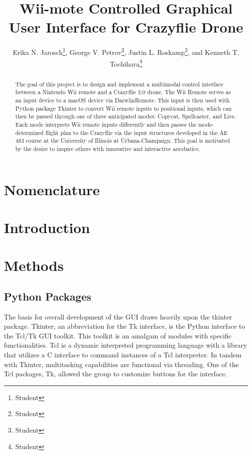 \documentclass[conf]{new-aiaa}
\title{Wii-mote Controlled Graphical User Interface for Crazyflie Drone}
\author{Erika N. Jarosch\footnote{Student}, George V. Petrov\footnote{Student}, Justin L. Roskamp\footnote{Student}, and Kenneth T. Tochihara\footnote{Student}}
\affil{University of Illinois at Urbana-Champaign, Urbana, IL, 61820}
\begin{document}
\maketitle

\begin{abstract} %
The goal of this project is to design and implement a multimodal control interface between a Nintendo Wii remote and a Crazyflie 2.0 drone. The Wii Remote serves as an input device to a macOS device via DarwiinRemote. This input is then used with Python package Tkinter to convert Wii remote inputs to positional inputs, which can then be passed through one of three anticipated modes: Copycat, Spellcaster, and Live. Each mode interprets Wii remote inputs differently and then passes the mode-determined flight plan to the Crazyflie via the input structures developed in the AE 483 course at the University of Illinois at Urbana-Champaign. This goal is motivated by the desire to inspire others with innovative and interactive aerobatics.

\end{abstract}

\section{Nomenclature}

\section{Introduction}

\section{Methods}

    \subsection{Python Packages}
        
        The basis for overall development of the GUI draws heavily upon the tkinter package. Tkinter, an abbreviation for the Tk interface, is the Python interface to the Tcl/Tk GUI toolkit. This toolkit is an amalgam of modules with specific functionalities. Tcl is a dynamic interpreted programming language with a library that utilizes a C interface to command instances of a Tcl interpreter. In tandem with Tkinter, multitasking capabilities are functional via threading. One of the Tcl packages, Tk, allowed the group to customize buttons for the interface. 
        
\end{document}
